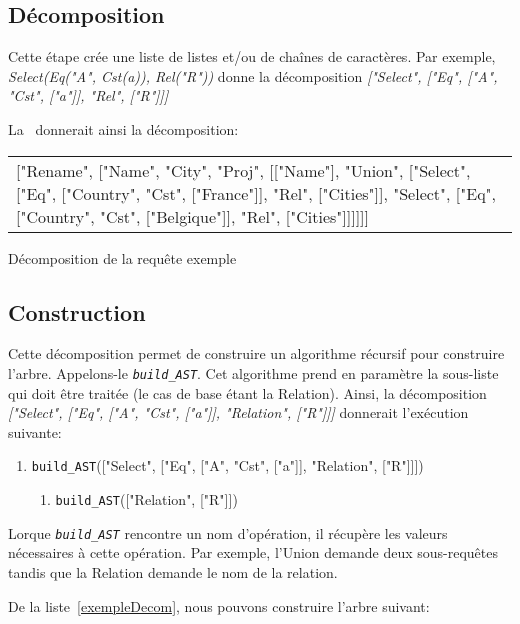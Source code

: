 \documentclass[]{article}
\begin{document}
\subsection{D\'ecomposition}
Cette \'etape cr\'ee une liste de listes et/ou de chaînes de caract\`eres. Par exemple, \textit{Select(Eq("A", Cst(a)), Rel("R"))} donne la d\'ecomposition \textit{["Select", ["Eq", ["A", "Cst", ["a"]], "Rel", ["R"]]]}

La~ donnerait ainsi la d\'ecomposition:

\begin{decomposition}[H]
	\centering
	\begin{tabular}{p{250px}}
		["Rename", ["Name", "City", "Proj", [["Name"], "Union", ["Select", ["Eq", ["Country", "Cst", ["France"]], "Rel", ["Cities"]], "Select", ["Eq", ["Country", "Cst", ["Belgique"]], "Rel", ["Cities"]]]]]]
	\end{tabular}
	\caption{Décomposition de la requ\^ete exemple}
	\label{exempleDecom}
\end{decomposition}

\subsection{Construction}

Cette d\'ecomposition permet de construire un algorithme r\'ecursif pour construire l'arbre. Appelons-le \textit{\texttt{build\_AST}}. Cet algorithme prend en param\`etre la sous-liste qui doit \^etre trait\'ee (le cas de base \'etant la Relation). Ainsi, la d\'ecomposition \textit{["Select", ["Eq", ["A", "Cst", ["a"]], "Relation", ["R"]]]} donnerait l'ex\'ecution suivante:

\begin{enumerate}
	\item \texttt{build\_AST}(["Select", ["Eq", ["A", "Cst", ["a"]], "Relation", ["R"]]])
        \begin{enumerate}
			\item \texttt{build\_AST}(["Relation", ["R"]])
        \end{enumerate}
\end{enumerate}

Lorque \textit{\texttt{build\_AST}} rencontre un nom d'op\'eration, il r\'ecup\`ere les valeurs n\'ecessaires \`a cette op\'eration. Par exemple, l'Union demande deux sous-requ\^etes tandis que la Relation demande le nom de la relation.

De la liste~\ref{exempleDecom}, nous pouvons construire l'arbre suivant:
\end{document}
